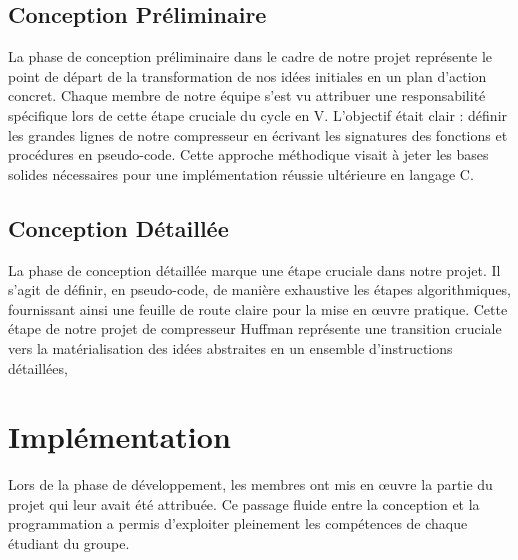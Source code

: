 \documentclass[12pt]{article}
\begin{document}
\subsection{Conception Préliminaire}
La phase de conception préliminaire dans le cadre de notre projet représente le point de départ de la transformation de nos idées initiales en un plan d'action concret. Chaque membre de notre équipe s'est vu attribuer une responsabilité spécifique lors de cette étape cruciale du cycle en V. L'objectif était clair : définir les grandes lignes de notre compresseur en écrivant les signatures des fonctions et procédures en pseudo-code. Cette approche méthodique visait à jeter les bases solides nécessaires pour une implémentation réussie ultérieure en langage C.\newline








\subsection{Conception Détaillée}
La phase de conception détaillée marque une étape cruciale dans notre projet. Il s'agit de définir, en pseudo-code, de manière exhaustive les étapes algorithmiques, fournissant ainsi une feuille de route claire pour la mise en œuvre pratique. Cette étape de notre projet de compresseur Huffman représente une transition cruciale vers la matérialisation des idées abstraites en un ensemble d'instructions détaillées, 









\section{Implémentation}
Lors de la phase de développement, les membres ont mis en œuvre la partie du projet qui leur avait été attribuée. Ce passage fluide entre la conception et la programmation a permis d'exploiter pleinement les compétences de chaque étudiant du groupe.

\end{document}
